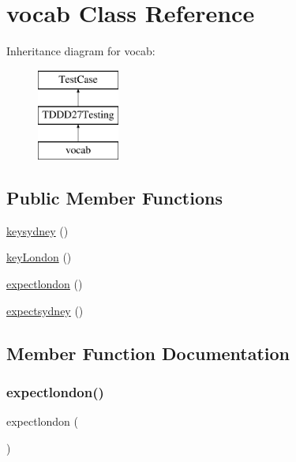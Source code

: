 \hypertarget{classvocab}{}\section{vocab Class Reference}
\label{classvocab}
Inheritance diagram for vocab\+:\begin{figure}[H]
\begin{center}
\leavevmode
\includegraphics[height=3.000000cm]{classvocab}
\end{center}
\end{figure}
\subsection*{Public Member Functions}
\begin{DoxyCompactItemize}
\item 
\mbox{\hyperlink{classvocab_a154d9bd15e3326b9d91eaec11e4f4962}{keysydney}} ()
\item 
\mbox{\hyperlink{classvocab_a0ec3bfa6a46eb82117bc585e3f4ae367}{key\+London}} ()
\item 
\mbox{\hyperlink{classvocab_ac3a6124a50423e286b4c73dc2daf0aa4}{expectlondon}} ()
\item 
\mbox{\hyperlink{classvocab_a4741a8bc50fd4f346d8671e4cfd99bf7}{expectsydney}} ()
\end{DoxyCompactItemize}


\subsection{Member Function Documentation}
\mbox{\label{classvocab_ac3a6124a50423e286b4c73dc2daf0aa4}} 
\subsubsection{\texorpdfstring{expectlondon()}{expectlondon()}}
{\footnotesize\ttfamily expectlondon (\begin{DoxyParamCaption}{ }\end{DoxyParamCaption})}


